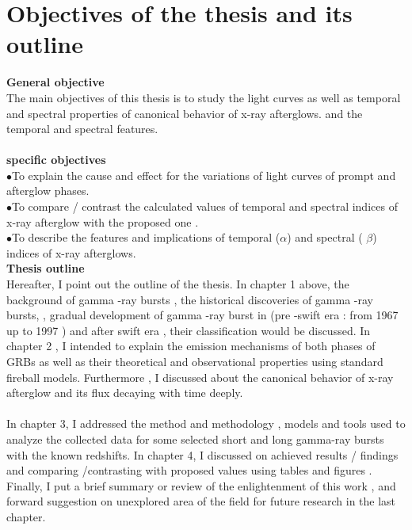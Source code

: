 \section{Objectives of the thesis and its outline}
\textbf{General objective}\\
 The main objectives of this thesis is to study the light curves as well as temporal and spectral properties of canonical behavior of x-ray afterglows. and the  temporal and spectral  features.\\\\    
\textbf{specific objectives}\\
$\bullet$To explain the  cause and effect  for the  variations of light curves of  prompt and afterglow phases.\\
$\bullet$To compare / contrast the calculated values  of temporal and spectral  indices of x-ray afterglow with the proposed  one .\\
$\bullet$To describe the features and implications of  temporal ($\alpha$) and spectral ( $ \beta $) indices  of x-ray afterglows.\\
\textbf{Thesis outline}\\
 Hereafter, I point out the outline of the thesis. In chapter 1 above, the  background of gamma -ray bursts , the  historical discoveries of gamma -ray bursts,  ,  gradual development of gamma -ray burst in (pre -swift  era :  from 1967 up to 1997 ) and after swift era , their  classification   would be discussed. In chapter 2 , I intended to explain the emission mechanisms of both phases of GRBs as well as  their  theoretical and observational properties  using standard fireball models. Furthermore , I discussed  about the canonical behavior  of x-ray afterglow  and  its  flux decaying  with time deeply. \\\\
In chapter 3, I  addressed   the method and   methodology , models  and  tools  used to analyze  the   collected  data   for  some  selected  short  and  long  gamma-ray  bursts  with  the known  redshifts.
In chapter 4, I  discussed  on achieved results / findings  and  comparing /contrasting with proposed values  using tables and figures . Finally, I put  a brief summary or review of the enlightenment of this work , and   forward suggestion on unexplored area of the field  for future research in the last chapter. 
